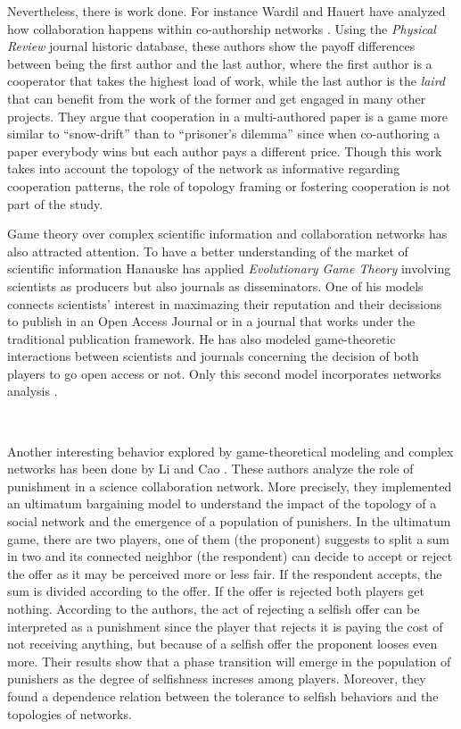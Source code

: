 \documentclass{bmcart}
\begin{document}
{\color{red}Nevertheless, there is work done. For instance Wardil and Hauert have
analyzed how collaboration happens within co-authorship networks
\cite{Wardil-etal:2015}. Using the \emph{Physical Review} journal
historic database, these authors show the payoff differences between
being the first author and the last author, where the first author is
a cooperator that takes the highest load of work, while the last
author is the \emph{laird} that can benefit from the work of the
former and get engaged in many other projects. They argue that
cooperation in a multi-authored paper is a game more similar to ``snow-drift''
than to ``prisoner's dilemma'' since when co-authoring a
paper everybody wins but each author pays a different price. Though
this work takes into account the topology of the network as
informative regarding cooperation patterns, the role of topology
framing or fostering cooperation is not part of the study.} \\

{\color{red}

Game theory over complex scientific information and collaboration
networks has also attracted attention. To have a better understanding
of the market of scientific information Hanauske has applied
\emph{Evolutionary Game Theory} involving scientists as producers but
also journals as disseminators. One of his models connects scientists'
interest in maximazing their reputation and their decissions to
publish in an Open Access Journal or in a journal that works under the
traditional publication framework. He has also modeled game-theoretic
interactions between scientists and journals concerning the decision
of both players to go open access or not. Only this second model
incorporates networks analysis \cite{Hanauske-etal:2012}.}\\

{\color{red}

Another interesting behavior explored by game-theoretical modeling and
complex networks has been done by Li and Cao \cite{Li-etal:2009}. These
authors analyze the role of punishment in a science collaboration
network. More precisely, they implemented an ultimatum bargaining
model to understand the impact of the topology of a social network and
the emergence of a population of punishers. In the ultimatum game,
there are two players, one of them (the proponent) suggests to split a
sum in two and its connected neighbor (the respondent) can decide to
accept or reject the offer as it may be perceived more or less
fair. If the respondent accepts, the sum is divided according to the
offer. If the offer is rejected both players get nothing. According to
the authors, the act of rejecting a selfish offer can be interpreted
as a punishment since the player that rejects it is paying the cost of
not receiving anything, but because of a selfish offer the proponent
looses even more. Their results show that a phase transition will
emerge in the population of punishers as the degree of selfishness
increses among players. Moreover, they found a dependence relation
between the tolerance to selfish behaviors and the topologies of
networks.}\\
\end{document}
